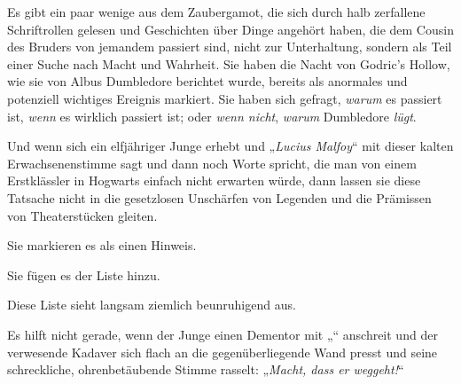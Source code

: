 Es gibt ein paar wenige aus dem Zaubergamot, die sich durch halb zerfallene Schriftrollen gelesen und Geschichten über Dinge angehört haben, die dem Cousin des Bruders von jemandem passiert sind, nicht zur Unterhaltung, sondern als Teil einer Suche nach Macht und Wahrheit.
Sie haben die Nacht von Godric’s Hollow, wie sie von Albus Dumbledore berichtet wurde, bereits als anormales und potenziell wichtiges Ereignis markiert.
Sie haben sich gefragt, \emph{warum} es passiert ist, \emph{wenn} es wirklich passiert ist; oder \emph{wenn nicht}, \emph{warum} Dumbledore \emph{lügt}.

Und wenn sich ein elfjähriger Junge erhebt und „\emph{Lucius Malfoy}“ mit dieser kalten Erwachsenenstimme sagt und dann noch Worte spricht, die man von einem Erstklässler in Hogwarts einfach nicht erwarten würde, dann lassen sie diese Tatsache nicht in die gesetzlosen Unschärfen von Legenden und die Prämissen von Theaterstücken gleiten.

Sie markieren es als einen Hinweis.

Sie fügen es der Liste hinzu.

Diese Liste sieht langsam ziemlich beunruhigend aus.

Es hilft nicht gerade, wenn der Junge einen Dementor mit „“ anschreit und der verwesende Kadaver sich flach an die gegenüberliegende Wand presst und seine schreckliche, ohrenbetäubende Stimme rasselt: „\emph{Macht, dass er weggeht!}“

